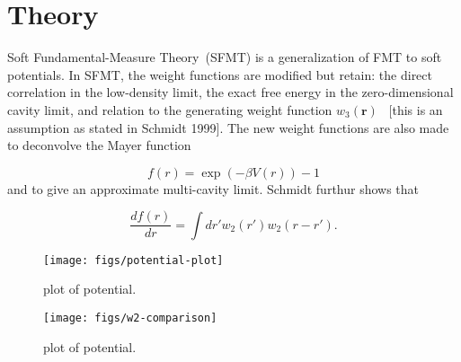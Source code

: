 \documentclass[letterpaper,twocolumn,amsmath,amssymb,prb]{revtex4-1}
\newcommand{\red}[1]{{\color{red} #1}}
\newcommand{\rr}{\textbf{r}}
\newcommand{\fixme}[1]{\red{[#1]}}
\begin{document}
\section{Theory}

Soft Fundamental-Measure Theory~(SFMT) is a generalization of FMT to
soft potentials. In SFMT, the weight functions are modified but retain:
the direct correlation in the low-density limit, the exact free energy
in the zero-dimensional cavity limit, and relation to the generating
weight function $w_3(\rr)$~\cite{schmidt1999density} \fixme{this is an assumption
  as stated in Schmidt 1999}.  The new weight functions are also made
to deconvolve the Mayer function   

\begin{equation}
f(r) = \exp (-\beta V(r)) - 1
\end{equation}
and to give an approximate multi-cavity limit. Schmidt furthur shows that\cite{schmidt2000fluid}

\begin{equation}\label{eq:mayerandw2}
\frac{d f(r)}{dr} = \int dr' w_2(r') w_2 (r-r').
\end{equation}

\begin{figure}
\begin{center}
\texttt{[image: figs/potential-plot]}
\end{center}
\caption{plot of potential.}
\label{fig:potential-plot}
\end{figure}

\begin{figure}
\begin{center}
\texttt{[image: figs/w2-comparison]}
\end{center}
\caption{plot of potential.}
\label{fig:w2-comparison}
\end{figure}
\end{document}

